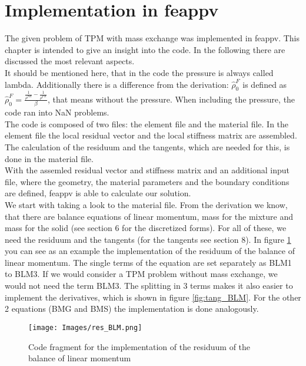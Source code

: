 \documentclass[12pt]{article}
\begin{document}
\section{\huge{Implementation in feappv}}

The given problem of TPM with mass exchange was implemented in feappv. This chapter is intended to give an insight into the code. In the following there are discussed the most relevant aspects. \\
It should be mentioned here, that in the code the pressure is always called lambda. Additionally there is a difference from the derivation: $\hat{\rho}_{0}^{F}$ is defined as $\hat{\rho}_{0}^{F} = \frac{\frac{1}{\rho^{SR}}-\frac{1}{\rho^{FR}}}{\beta}$, that means without the pressure. When including the pressure, the code ran into NaN problems.\\

The code is composed of two files: the element file and the material file. In the element file the local residual vector and the local stiffness matrix are assembled. The calculation of the residuum and the tangents, which are needed for this, is done in the material file. \\
With the assemled residual vector and stiffness matrix and an additional input file, where the geometry, the material parameters and the boundary conditions are defined, feappv is able to calculate our solution. \\ 

We start with taking a look to the material file. From the derivation we know, that there are balance equations of linear momentum, mass for the mixture and mass for the solid (see section 6 for the discretized forms). For all of these, we need the residuum and the tangents (for the tangents see section 8). In figure \ref{fig:res_BLM} you can see as an example the implementation of the residuum of the balance of linear momentum. The single terms of the equation are set separately as BLM1 to BLM3. If we would consider a TPM problem without mass exchange, we would not need the term BLM3. The splitting in 3 terms makes it also easier to implement the derivatives, which is shown in figure \ref{fig:tang_BLM}. For the other 2 equations (BMG and BMS) the implementation is done analogously. \\

\begin{figure}[H]
	\centering
	\texttt{[image: Images/res\_BLM.png]}
	\caption{Code fragment for the implementation of the residuum of the balance of linear momentum}
	\label{fig:res_BLM}
\end{figure}
\end{document}
